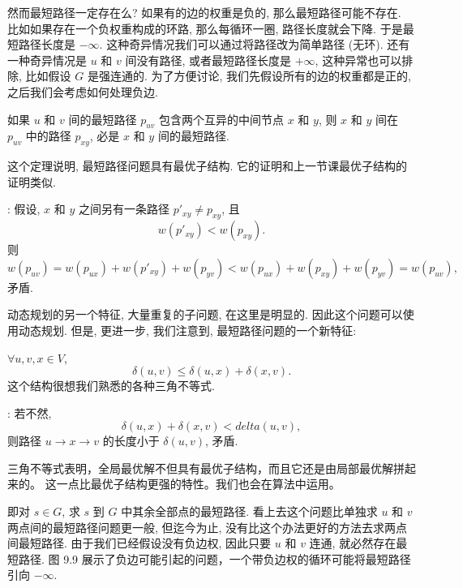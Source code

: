 \documentclass[a4paper]{ctexart}
\theoremstyle{definition}
\theoremstyle{definition}
\begin{document}
然而最短路径一定存在么? 如果有的边的权重是负的, 那么最短路径可能不存在.
比如如果存在一个负权重构成的环路, 那么每循环一圈, 路径长度就会下降.
于是最短路径长度是 $-\infty$. 这种奇异情况我们可以通过将路径改为简单路径 (无环).
还有一种奇异情况是 $u$ 和 $v$ 间没有路径, 或者最短路径长度是 $+\infty$,
这种异常也可以排除, 比如假设 $G$ 是强连通的. 为了方便讨论,
我们先假设所有的边的权重都是正的, 之后我们会考虑如何处理负边.

 如果 $u$ 和 $v$ 间的最短路径 $p_{uv}$ 包含两个互异的中间节点
$x$ 和 $y$, 则 $x$ 和 $y$ 间在 $p_{uv}$ 中的路径 $p_{xy}$, 必是 $x$ 和 $y$ 间的最短路径.

这个定理说明, 最短路径问题具有最优子结构. 它的证明和上一节课最优子结构的证明类似.

: 假设, $x$ 和 $y$ 之间另有一条路径 $p'_{xy} \neq p_{xy}$, 且
$$
w(p'_{xy}) < w(p_{xy}).
$$
则
$$
w(p_{uv}) = w(p_{ux}) + w(p'_{xy}) + w(p_{yv}) < w(p_{ux}) + w(p_{xy}) + w(p_{yv})
= w(p_{uv}),
$$
矛盾. 

动态规划的另一个特征, 大量重复的子问题, 在这里是明显的. 因此这个问题可以使用动态规划.
但是, 更进一步, 我们注意到, 最短路径问题的一个新特征:

 $\forall u, v, x \in V$,
$$
\delta(u, v) \leq \delta(u, x) + \delta(x, v).
$$
这个结构很想我们熟悉的各种三角不等式.

: 若不然,
$$
\delta(u, x) + \delta(x, v) < delta(u, v),
$$
则路径 $u \to x \to v$ 的长度小于 $\delta(u, v)$, 矛盾. 

三角不等式表明，全局最优解不但具有最优子结构，而且它还是由局部最优解拼起来的。
这一点比最优子结构更强的特性。我们也会在算法中运用。






即对 $s \in G$, 求 $s$ 到 $G$ 中其余全部点的最短路径. 看上去这个问题比单独求
$u$ 和 $v$ 两点间的最短路径问题更一般, 但迄今为止, 没有比这个办法更好的方法去求两点间最短路径.
由于我们已经假设没有负边权, 因此只要 $u$ 和 $v$ 连通, 就必然存在最短路径. 
图 9.9 展示了负边可能引起的问题，一个带负边权的循环可能将最短路径引向 $-\infty$. 
\end{document}

